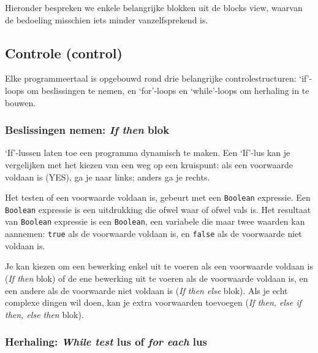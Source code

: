 Hieronder bespreken we enkele belangrijke blokken uit de blocks view, waarvan de bedoeling misschien iets minder vanzelfsprekend is.

\subsection{Controle (control)}
Elke programmeertaal is opgebouwd rond drie belangrijke controlestructuren: \textquoteleft if\textquoteright-loops om beslissingen te nemen, en \textquoteleft for\textquoteright-loops en \textquoteleft while\textquoteright-loops om herhaling in te bouwen.

\subsubsection{Beslissingen nemen: \emph{If then} blok}

\begin{minipage}{.5\linewidth}
\end{minipage}
\begin{minipage}{.5\linewidth}
\end{minipage}

\textquoteleft If\textquoteright-lussen laten toe een programma dynamisch te maken. Een \textquoteleft If\textquoteright-lus kan je vergelijken met het kiezen van een weg op een kruispunt: als een voorwaarde voldaan is (YES), ga je naar links; anders ga je rechts. 

Het testen of een voorwaarde voldaan is, gebeurt met een \texttt{Boolean} expressie.
Een \texttt{Boolean} expressie is een uitdrukking die ofwel waar of ofwel vals is.
Het resultaat van \texttt{Boolean} expressie is een \texttt{Boolean}, een variabele die maar twee waarden kan aannemen: \texttt{true} als de voorwaarde voldaan is, en \texttt{false} als de voorwaarde niet voldaan is.

Je kan kiezen om een bewerking enkel uit te voeren als een voorwaarde voldaan is (\emph{If then} blok) of de ene bewerking uit te voeren als de voorwaarde voldaan is, en een andere als de voorwaarde niet voldaan is (\emph{If then else} blok). Als je echt complexe dingen wil doen, kan je extra voorwaarden toevoegen (\emph{If then, else if then, else then} blok).

\subsubsection{Herhaling: \emph{While test} lus of \emph{for each} lus}

